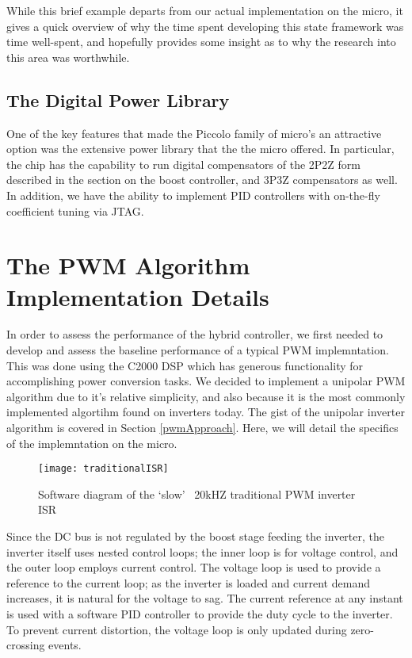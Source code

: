 While this brief example departs from our actual implementation on the micro, it gives a quick overview of why the time spent developing this state framework was time well-spent, and hopefully provides some insight as to why the research into this area was worthwhile.

\subsection{The Digital Power Library}
One of the key features that made the Piccolo family of micro's an attractive option was the extensive power library that the the micro offered. In particular, the chip has the capability to run digital compensators of the 2P2Z form described in the section on the boost controller, and 3P3Z compensators as well. In addition, we have the ability to implement PID controllers with on-the-fly coefficient tuning via JTAG.

\section{The PWM Algorithm Implementation Details}
In order to assess the performance of the hybrid controller, we first needed to develop and assess the baseline performance of a typical PWM implemntation. This was done using the C2000 DSP which has generous functionality for accomplishing power conversion tasks. We decided to implement a unipolar PWM algorithm due to it's relative simplicity, and also because it is the most commonly implemented algortihm found on inverters today. The gist of the unipolar inverter algorithm is covered in Section \ref{pwmApproach}. Here, we will detail the specifics of the implemntation on the micro.

\begin{figure}[h]
\begin{center}
\texttt{[image: traditionalISR]}
\caption{Software diagram of the `slow' ~20kHZ traditional PWM inverter ISR}
\label{fast}
\end{center}
\end{figure}

Since the DC bus is not regulated by the boost stage feeding the inverter, the inverter itself uses nested control loops; the inner loop is for voltage control, and the outer loop employs current control. The voltage loop is used to provide a reference to the current loop; as the inverter is loaded and current demand increases, it is natural for the voltage to sag. The current reference at any instant is used with a software PID controller to provide the duty cycle to the inverter. To prevent current distortion, the voltage loop is only updated during zero-crossing events.


